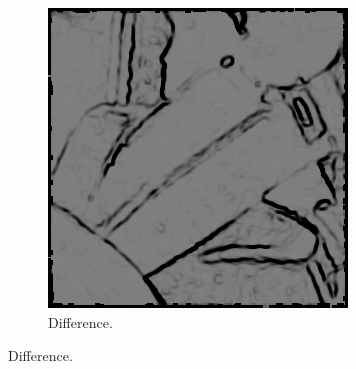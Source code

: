 \begin{figure}[H]
\centering
  \begin{subfigure}{\linewidth}
  \centering
    \includegraphics[width = \cutOutWidth]{graphics/complex1_blurr_difference_50.png}
    \caption{Difference.}
    \label{fig:complex1_blur_difference}
  \end{subfigure}
  

\end{figure}
